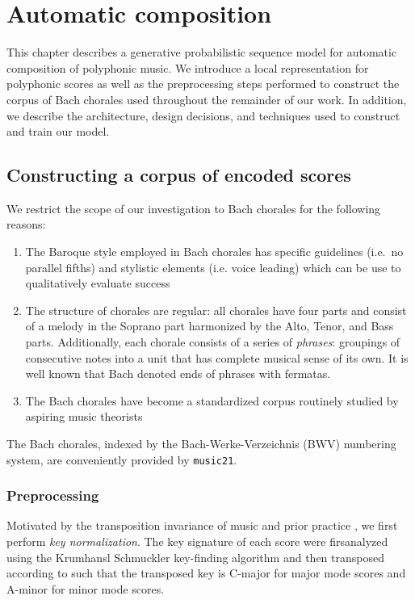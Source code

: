 \documentclass[dissertation.tex]{subfiles}
\begin{document}
\chapter{Automatic composition}

This chapter describes a generative probabilistic sequence model for automatic
composition of polyphonic music. We introduce a local representation for
polyphonic scores as well as the preprocessing steps performed to construct
the corpus of Bach chorales used throughout the remainder of our work. In addition,
we describe the architecture, design decisions, and techniques used to construct
and train our model.

\section{Constructing a corpus of encoded scores}

We restrict the scope of our investigation to Bach chorales for the following reasons:
\begin{enumerate}
  \item The Baroque style employed in Bach chorales has specific guidelines
    \cite{piston1978harmony} (i.e.\ no parallel fifths) and stylistic elements
    (i.e. voice leading) which can be use to qualitatively evaluate success
  \item The structure of chorales are regular: all chorales have four parts and
    consist of a melody in the Soprano part harmonized by the Alto, Tenor, and
    Bass parts. Additionally, each chorale consists of a series of \emph{phrases}:
    groupings of consecutive notes into a unit that has complete musical sense
    of its own\cite{nattiez1990music}. It is well known that Bach
    denoted ends of phrases with fermatas.
  \item The Bach chorales have become a standardized corpus routinely studied
    by aspiring music theorists\cite{white2002guidelines}
\end{enumerate}
The Bach chorales, indexed by the Bach-Werke-Verzeichnis (BWV) numbering
system\cite{butt1999bach}, are conveniently provided by
\texttt{music21}\cite{Scott2015}.

\subsection{Preprocessing}

Motivated by the transposition invariance of music and prior practice
\cite{mozer1994neural} \cite{Eck2002} \cite{franklin2004recurrent}
\cite{franklin2005jazz}, we first perform \emph{key normalization}.
The key signature of each score were firsanalyzed using the Krumhansl
Schmuckler key-finding algorithm \cite{krumhansl2001cognitive} and then
transposed according to  such that the transposed key is
C-major for major mode scores and A-minor for minor mode scores.
\end{document}
